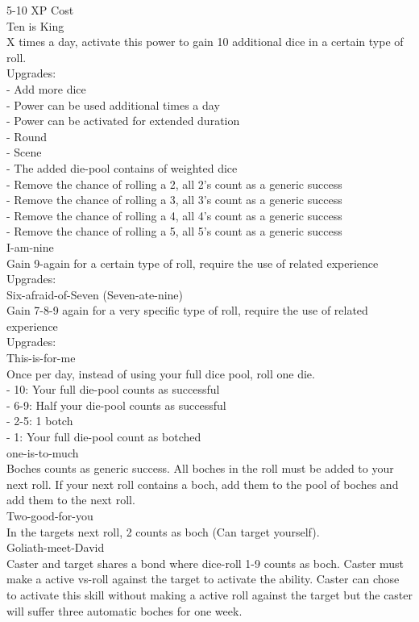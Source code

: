 5-10 XP Cost\\

Ten is King\\
X times a day, activate this power to gain 10 additional dice in a certain type of roll.\\
Upgrades:\\
- Add more dice\\
- Power can be used additional times a day\\
- Power can be activated for extended duration\\
	\tab- Round\\
	\tab- Scene\\\textsl{}
- The added die-pool contains of weighted dice\\
	\tab- Remove the chance of rolling a 2, all 2's count as a generic success\\
	\tab- Remove the chance of rolling a 3, all 3's count as a generic success\\
	\tab- Remove the chance of rolling a 4, all 4's count as a generic success\\
	\tab- Remove the chance of rolling a 5, all 5's count as a generic success\\
	

I-am-nine\\
Gain 9-again for a certain type of roll, require the use of related experience\\
Upgrades:\\


Six-afraid-of-Seven (Seven-ate-nine)\\
Gain 7-8-9 again for a very specific type of roll, require the use of related experience\\
Upgrades:\\

This-is-for-me\\
Once per day, instead of using your full dice pool, roll one die.\\
- 10: Your full die-pool counts as successful\\
- 6-9: Half your die-pool counts as successful\\
- 2-5: 1 botch\\
- 1: Your full die-pool count as botched\\

one-is-to-much\\
Boches counts as generic success. All boches in the roll must be added to your next roll. If your next roll contains a boch, add them to the pool of boches and add them to the next roll.\\

Two-good-for-you\\
In the targets next roll, 2 counts as boch (Can target yourself).\\

Goliath-meet-David\\
Caster and target shares a bond where dice-roll 1-9 counts as boch. Caster must make a active vs-roll against the target to activate the ability. Caster can chose to activate this skill without making a active roll against the target but the caster will suffer three automatic boches for one week.\\